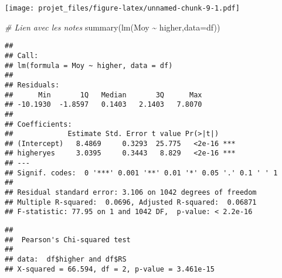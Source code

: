 \documentclass[
]{article}
\newenvironment{Shaded}{\begin{snugshade}}{\end{snugshade}}
\newcommand{\AttributeTok}[1]{\textcolor[rgb]{0.77,0.63,0.00}{#1}}
\newcommand{\CommentTok}[1]{\textcolor[rgb]{0.56,0.35,0.01}{\textit{#1}}}
\newcommand{\FunctionTok}[1]{\textcolor[rgb]{0.00,0.00,0.00}{#1}}
\newcommand{\NormalTok}[1]{#1}
\newcommand{\OtherTok}[1]{\textcolor[rgb]{0.56,0.35,0.01}{#1}}
\newcommand{\SpecialCharTok}[1]{\textcolor[rgb]{0.00,0.00,0.00}{#1}}
\newcommand{\StringTok}[1]{\textcolor[rgb]{0.31,0.60,0.02}{#1}}
\begin{document}
\texttt{[image: projet\_files/figure-latex/unnamed-chunk-9-1.pdf]}

\begin{Shaded}
\begin{Highlighting}[]
\CommentTok{\# Lien avec les notes}
\FunctionTok{summary}\NormalTok{(}\FunctionTok{lm}\NormalTok{(Moy }\SpecialCharTok{\textasciitilde{}}\NormalTok{ higher,}\AttributeTok{data=}\NormalTok{df))}
\end{Highlighting}
\end{Shaded}

\begin{verbatim}
## 
## Call:
## lm(formula = Moy ~ higher, data = df)
## 
## Residuals:
##      Min       1Q   Median       3Q      Max 
## -10.1930  -1.8597   0.1403   2.1403   7.8070 
## 
## Coefficients:
##             Estimate Std. Error t value Pr(>|t|)    
## (Intercept)   8.4869     0.3293  25.775   <2e-16 ***
## higheryes     3.0395     0.3443   8.829   <2e-16 ***
## ---
## Signif. codes:  0 '***' 0.001 '**' 0.01 '*' 0.05 '.' 0.1 ' ' 1
## 
## Residual standard error: 3.106 on 1042 degrees of freedom
## Multiple R-squared:  0.0696, Adjusted R-squared:  0.06871 
## F-statistic: 77.95 on 1 and 1042 DF,  p-value: < 2.2e-16
\end{verbatim}

\begin{Shaded}
\end{Shaded}

\begin{verbatim}
## 
##  Pearson's Chi-squared test
## 
## data:  df$higher and df$RS
## X-squared = 66.594, df = 2, p-value = 3.461e-15
\end{verbatim}

\begin{Shaded}
\end{Shaded}
\end{document}
